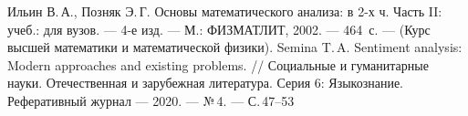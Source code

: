 \begin{thebibliography}{1}
\thispagestyle{fancy}
%
{Ильин В.\,А., Позняк Э.\,Г.} {Основы математического анализа: в 2\nobreakdash-х ч. Часть II: учеб.: для
вузов.}
--- 4\nobreakdash-е изд.
--- М.: ФИЗМАТЛИТ, 2002. --- 464~с.
---
(Курс высшей математики и математической физики).
%
%
%
{Semina T.\,A.}
{Sentiment analysis: Modern approaches and existing
problems.}
//
Социальные и гуманитарные науки. Отечественная и зарубежная литература. Серия 6: Языкознание. Реферативный журнал
---
2020.
---
№\,4.
---
С.\,47\nobreakdash--53
%
%
%
%
%
%
%
%
%
%
%
%
%
%
%
%
%
%
%
%
%
%
%
%
%
%
%
%
%
%
%
%
%
%
%
%
%
%
%
%
%
%
%
%
%
%
%
%
%
%

\end{thebibliography}
